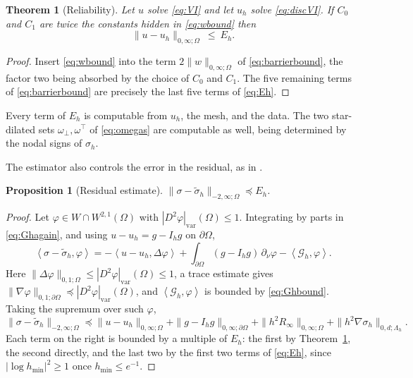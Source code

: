 \documentclass[12pt]{amsart}
\newtheorem{theorem}{Theorem}
\newtheorem{proposition}{Proposition}
\theoremstyle{definition}
\newcommand{\Om}{\Omega}
\newcommand{\dOm}{\partial\Omega}
\newcommand{\Ih}{I_h}
\newcommand{\Gh}{\mathcal{G}_h}
\newcommand{\Lamh}{\Lambda_h}
\newcommand{\ombot}{\omega_\bot}
\newcommand{\omtop}{\omega^\top}
\begin{document}
\begin{theorem}[Reliability]
\label{thm:reliability}
Let $u$ solve \eqref{eq:VI} and let $u_h$ solve \eqref{eq:discVI}.  If $C_0$ and $C_1$ are twice the constants hidden in \eqref{eq:wbound} then
\begin{equation}
\label{eq:reliability}
  \|u-u_h\|_{0,\infty;\Om} \ \le\ E_h.
\end{equation}
\end{theorem}

\begin{proof}
Insert \eqref{eq:wbound} into the term $2\|w\|_{0,\infty;\Om}$ of \eqref{eq:barrierbound}, the factor two being absorbed by the choice of $C_0$ and $C_1$.  The five remaining terms of \eqref{eq:barrierbound} are precisely the last five terms of \eqref{eq:Eh}.
\end{proof}

Every term of $E_h$ is computable from $u_h$, the mesh, and the data.  The two star-dilated sets $\ombot,\omtop$ of \eqref{eq:omegas} are computable as well, being determined by the nodal signs of $\sigma_h$.

The estimator also controls the error in the residual, as in \cite[Theorem 5.4]{NSV03}.

\begin{proposition}[Residual estimate]
\label{prop:residualest}
$\|\sigma-\tilde\sigma_h\|_{-2,\infty;\Om} \preceq E_h$.
\end{proposition}

\begin{proof}
Let $\varphi \in W \cap W^{2,1}(\Om)$ with $|D^2\varphi|_{\mathrm{var}}(\Om)\le 1$.  Integrating by parts in \eqref{eq:Ghagain}, and using $u - u_h = g - \Ih g$ on $\dOm$,
\[
  \left<\sigma-\tilde\sigma_h,\varphi\right> = -\left<u-u_h,\Delta\varphi\right> + \int_{\dOm}(g-\Ih g)\,\partial_\nu\varphi - \left<\Gh,\varphi\right>.
\]
Here $\|\Delta\varphi\|_{0,1;\Om} \le |D^2\varphi|_{\mathrm{var}}(\Om) \le 1$, a trace estimate gives $\|\nabla\varphi\|_{0,1;\dOm} \preceq |D^2\varphi|_{\mathrm{var}}(\Om)$, and $\left<\Gh,\varphi\right>$ is bounded by \eqref{eq:Ghbound}.  Taking the supremum over such $\varphi$,
\[
  \|\sigma-\tilde\sigma_h\|_{-2,\infty;\Om} \preceq \|u-u_h\|_{0,\infty;\Om} + \|g-\Ih g\|_{0,\infty;\dOm} + \|h^2R_\infty\|_{0,\infty;\Om} + \|h^2\nabla\sigma_h\|_{0,d;\Lamh}.
\]
Each term on the right is bounded by a multiple of $E_h$: the first by Theorem~\ref{thm:reliability}, the second directly, and the last two by the first two terms of \eqref{eq:Eh}, since $|\log h_{\min}|^2 \ge 1$ once $h_{\min}\le e^{-1}$.
\end{proof}
\end{document}
